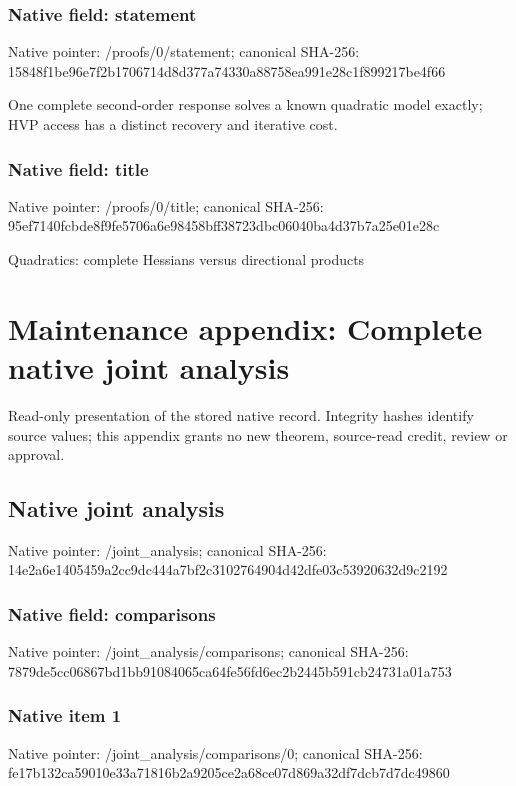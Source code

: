 \documentclass[10pt,a4paper]{article}
\begin{document}
\subsubsection{Native field: statement}
Native pointer: /proofs/0/statement; canonical SHA-256: 15848f1be96e7f2b1706714d8d377a74330a88758ea991e28c1f899217be4f66

\begingroup\raggedright\sloppy One complete second-order response solves a known quadratic model exactly;\allowbreak{} HVP access has a distinct recovery and iterative cost.\par\endgroup

\subsubsection{Native field: title}
Native pointer: /proofs/0/title; canonical SHA-256: 95ef7140fcbde8f9fe5706a6e98458bff38723dbc06040ba4d37b7a25e01e28c

\begingroup\raggedright\sloppy Quadratics:\allowbreak{} complete Hessians versus directional products\par\endgroup

\section{Maintenance appendix: Complete native joint analysis}
Read-only presentation of the stored native record. Integrity hashes identify source values; this appendix grants no new theorem, source-read credit, review or approval.

\subsection{Native joint analysis}
Native pointer: /joint\_\allowbreak{}analysis; canonical SHA-256: 14e2a6e1405459a2cc9dc444a7bf2c3102764904d42dfe03c53920632d9c2192

\subsubsection{Native field: comparisons}
Native pointer: /joint\_\allowbreak{}analysis/comparisons; canonical SHA-256: 7879de5cc06867bd1bb91084065ca64fe56fd6ec2b2445b591cb24731a01a753

\subsubsection{Native item 1}
Native pointer: /joint\_\allowbreak{}analysis/comparisons/0; canonical SHA-256: fe17b132ca59010e33a71816b2a9205ce2a68ce07d869a32df7dcb7d7dc49860
\end{document}
